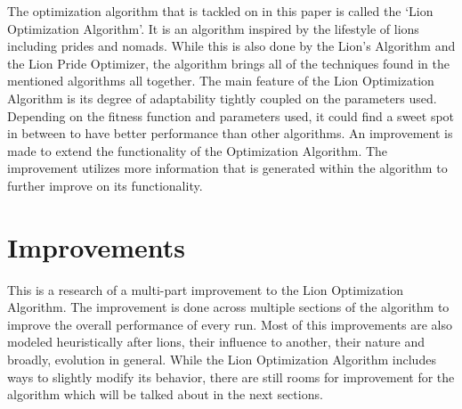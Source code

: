 \par The optimization algorithm that is tackled on in this paper is called the `Lion Optimization Algorithm'. It is an algorithm inspired by the lifestyle of lions including prides and nomads. While this is also done by the Lion's Algorithm and the Lion Pride Optimizer, the algorithm brings all of the techniques found in the mentioned algorithms all together. The main feature of the Lion Optimization Algorithm is its degree of adaptability tightly coupled on the parameters used. Depending on the fitness function and parameters used, it could find a sweet spot in between to have better performance than other algorithms. An improvement is made to extend the functionality of the Optimization Algorithm. The improvement utilizes more information that is generated within the algorithm to further improve on its functionality.

\section{Improvements}

\par This is a research of a multi-part improvement to the Lion Optimization Algorithm. The improvement is done across multiple sections of the algorithm to improve the overall performance of every run. Most of this improvements are also modeled heuristically after lions, their influence to another, their nature and broadly, evolution in general. While the Lion Optimization Algorithm includes ways to slightly modify its behavior, there are still rooms for improvement for the algorithm which will be talked about in the next sections.
